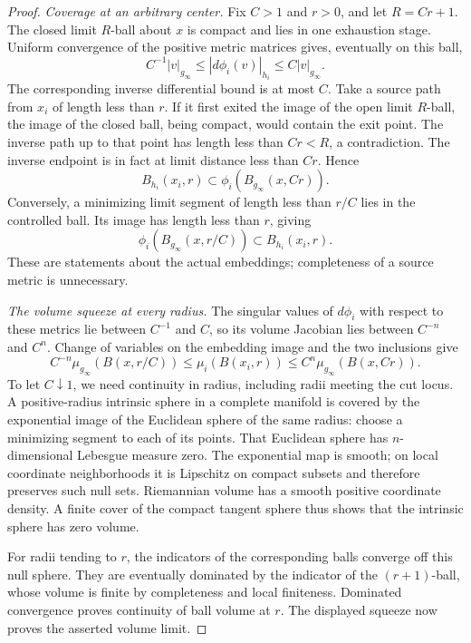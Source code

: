 \begin{proof}
\emph{Coverage at an arbitrary center.}
Fix $C>1$ and $r>0$, and let $R=Cr+1$.
The closed limit $R$-ball about $x$ is compact and lies in one
exhaustion stage.  Uniform convergence of the positive metric
matrices gives, eventually on this ball,
\[
 C^{-1}|v|_{g_\infty}
       \leq |d\phi_i(v)|_{h_i}
       \leq C|v|_{g_\infty}.
\]
The corresponding inverse differential bound is at most $C$.
Take a source path from $x_i$ of length less than $r$.
If it first exited the image of the open limit $R$-ball, the
image of the closed ball, being compact, would contain the
exit point.  The inverse path up to that point has length
less than $Cr<R$, a contradiction.  The inverse endpoint
is in fact at limit distance less than $Cr$.  Hence
\[
 B_{h_i}(x_i,r)\subset
       \phi_i(B_{g_\infty}(x,Cr)).
\]
Conversely, a minimizing limit segment of length less than
$r/C$ lies in the controlled ball.  Its image has length less
than $r$, giving
\[
 \phi_i(B_{g_\infty}(x,r/C))\subset B_{h_i}(x_i,r).
\]
These are statements about the actual embeddings; completeness
of a source metric is unnecessary.

\emph{The volume squeeze at every radius.}
The singular values of $d\phi_i$ with respect to these metrics
lie between $C^{-1}$ and $C$, so its volume Jacobian lies between
$C^{-n}$ and $C^n$.  Change of variables on the embedding image
and the two inclusions give
\[
 C^{-n}\mu_{g_\infty}(B(x,r/C))
 \leq\mu_i(B(x_i,r))
 \leq C^n\mu_{g_\infty}(B(x,Cr)).
\]
To let $C\downarrow1$, we need continuity in radius, including
radii meeting the cut locus.  A positive-radius intrinsic sphere
in a complete manifold is covered by the exponential image of
the Euclidean sphere of the same radius: choose a minimizing
segment to each of its points.  That Euclidean sphere has
$n$-dimensional Lebesgue measure zero.  The exponential map is
smooth; on local coordinate neighborhoods it is Lipschitz on
compact subsets and therefore preserves such null sets.
Riemannian volume has a smooth positive coordinate density.
A finite cover of the compact tangent sphere thus shows that
the intrinsic sphere has zero volume.

For radii tending to $r$, the indicators of the corresponding
balls converge off this null sphere.  They are eventually
dominated by the indicator of the $(r+1)$-ball, whose volume is
finite by completeness and local finiteness.  Dominated
convergence proves continuity of ball volume at $r$.
The displayed squeeze now proves the asserted volume limit.


\end{proof}
